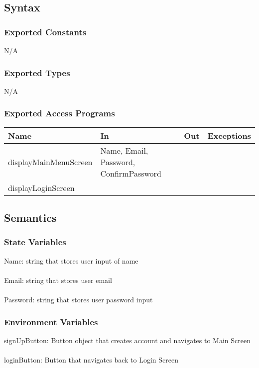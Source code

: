 \documentclass[12pt, titlepage]{article}
\begin{document}
\subsection{Syntax}

\subsubsection{Exported Constants}
N/A

\subsubsection{Exported Types}
N/A

\subsubsection{Exported Access Programs}

\begin{tabular}{| l | l | l | l |}
	\hline
	{\textbf{Name}} & {\textbf{In}} & {\textbf{Out}} & {\textbf{Exceptions}}\\
	\hline
	{displayMainMenuScreen} & Name, Email, Password, ConfirmPassword & & \\
    \hline
	{displayLoginScreen} & & & \\
	\hline
\end{tabular}

\subsection{Semantics}

\subsubsection{State Variables}
Name: string that stores user input of name\\\\
Email: string that stores user email\\\\
Password: string that stores user password input

\subsubsection{Environment Variables}
signUpButton: Button object that creates account and navigates to Main Screen\\\\
loginButton: Button that navigates back to Login Screen\\\\
\end{document}
